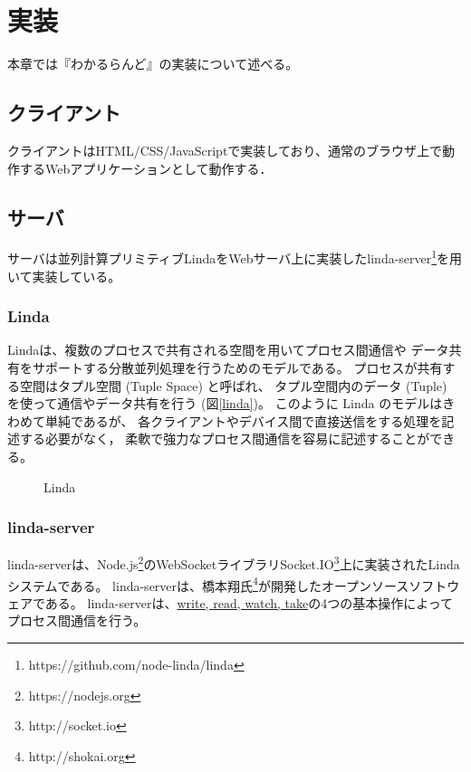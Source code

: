 \section{実装}
本章では『わかるらんど』の実装について述べる。

\subsection{クライアント}
クライアントはHTML/CSS/JavaScriptで実装しており、通常のブラウザ上で動作するWebアプリケーションとして動作する．

\subsection{サーバ}
サーバは並列計算プリミティブLindaをWebサーバ上に実装したlinda-server\footnote{https://github.com/node-linda/linda}を用いて実装している。

\subsubsection{Linda}
Lindaは、複数のプロセスで共有される空間を用いてプロセス間通信や
データ共有をサポートする分散並列処理を行うためのモデルである。
プロセスが共有する空間はタプル空間 (Tuple Space) と呼ばれ、
タプル空間内のデータ (Tuple) を使って通信やデータ共有を行う (図\ref{linda})。
このように Linda のモデルはきわめて単純であるが、
各クライアントやデバイス間で直接送信をする処理を記述する必要がなく，
柔軟で強力なプロセス間通信を容易に記述することができる。

\begin{figure}[h]
\centering
{}
\caption{Linda}
\label{button}
\end{figure}

\subsubsection{linda-server}
linda-serverは、Node.js\footnote{https://nodejs.org}のWebSocketライブラリSocket.IO\footnote{http://socket.io}上に実装されたLindaシステムである。
linda-serverは、橋本翔氏\footnote{http://shokai.org}が開発したオープンソースソフトウェアである。
linda-serverは、\url{write, read, watch, take}の4つの基本操作によってプロセス間通信を行う。

